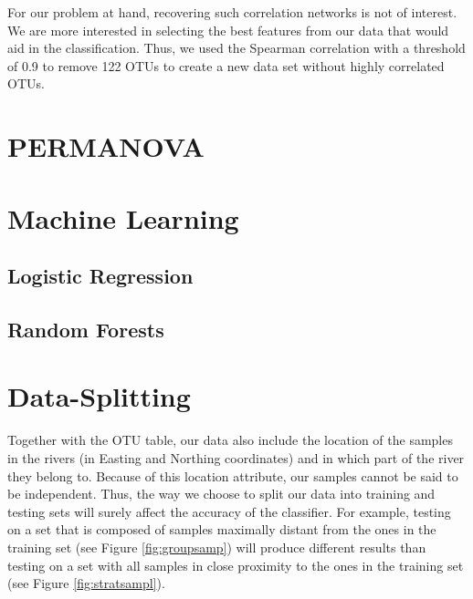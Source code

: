 For our problem at hand, recovering such correlation networks is not of interest. We are more interested in selecting the best features from our data that would aid in the classification. Thus, we used the Spearman correlation with a threshold of 0.9 to remove 122 OTUs to create a new data set without highly correlated OTUs. 








\section{PERMANOVA}
\section{Machine Learning}
\subsection{Logistic Regression}
\subsection{Random Forests}
\section{Data-Splitting}

Together with the OTU table, our data also include the location of the samples in the rivers (in Easting and Northing coordinates) and in which part of the river they belong to. Because of this location attribute, our samples cannot be said to be independent. Thus, the way we choose to split our data into training and testing sets will surely affect the accuracy of the classifier. For example, testing on a set that is composed of samples maximally distant from the ones in the training set (see Figure \ref{fig:groupsamp}) will produce different results than testing on a set with all samples in close proximity to the ones in the training set (see Figure \ref{fig:stratsampl}).

